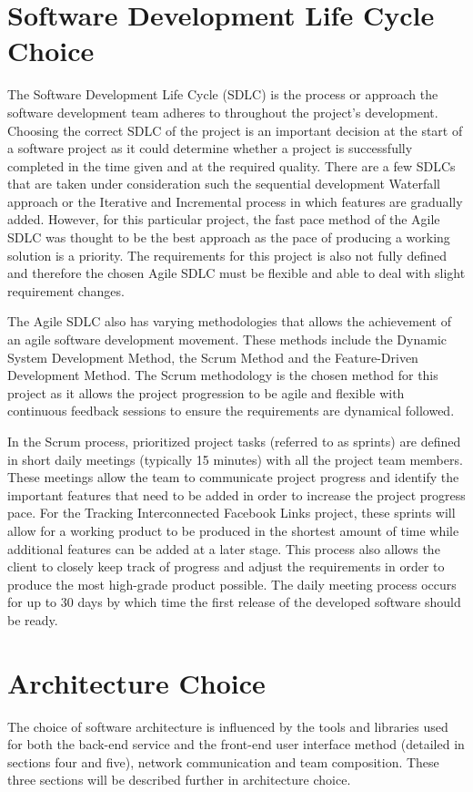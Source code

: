 \documentclass[10pt,onecolumn]{article}
\begin{document}
\section{Software Development Life Cycle Choice}
The Software Development Life Cycle (SDLC) is the process or approach the software development team adheres to throughout the project's development. Choosing the correct SDLC of the project is an important decision at the start of a software project as it could determine whether a project is successfully completed in the time given and at the required quality. There are a few SDLCs that are taken under consideration such the sequential development Waterfall approach or the Iterative and Incremental process in which features are gradually added. However, for this particular project, the fast pace method of the Agile SDLC was thought to be the best approach as the pace of producing a working solution is a priority. The requirements for this project is also not fully defined and therefore the chosen Agile SDLC must be flexible and able to deal with slight requirement changes.

The Agile SDLC also has varying methodologies that allows the achievement of an agile software development movement. These methods include the Dynamic System Development Method, the Scrum Method and the Feature-Driven Development Method. The Scrum methodology is the chosen method for this project as it allows the project progression to be agile and flexible with continuous feedback sessions to ensure the requirements are dynamical followed\cite{Kinsey}.

In the Scrum process, prioritized project tasks (referred to as sprints) are defined in short daily meetings (typically 15 minutes) with all the project team members. These meetings allow the team to communicate project progress and identify the important features that need to be added in order to increase the project progress pace. For the Tracking Interconnected Facebook Links project, these sprints will allow for a working product to be produced in the shortest amount of time while additional features can be  added at a later stage. This process also allows the client to closely keep track of progress and adjust the requirements in order to produce the most high-grade product possible. The daily meeting process occurs for up to 30 days by which time the first release of the developed software should be ready.   


\section{Architecture Choice}
The choice of software architecture is influenced by the tools and libraries used for both the back-end service and the front-end user interface method (detailed in sections four and five), network communication and team composition. These three sections will be described further in architecture choice. 
\end{document}

